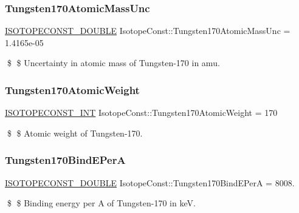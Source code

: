\subsubsection{\texorpdfstring{Tungsten170\+Atomic\+Mass\+Unc}{Tungsten170AtomicMassUnc}}
{\footnotesize\ttfamily \mbox{\hyperlink{group___isotope_const-_macros_ga8f45a7272ce02c0b4c65c44636ed719a}{I\+S\+O\+T\+O\+P\+E\+C\+O\+N\+S\+T\+\_\+\+D\+O\+U\+B\+LE}} Isotope\+Const\+::\+Tungsten170\+Atomic\+Mass\+Unc = 1.\+4165e-\/05}

\$ \$ Uncertainty in atomic mass of Tungsten-\/170 in amu. \mbox{\label{group___isotope_const-_tungsten-_w170_ga3981fdabda3e127cd873873fe976ad72}} 
\subsubsection{\texorpdfstring{Tungsten170\+Atomic\+Weight}{Tungsten170AtomicWeight}}
{\footnotesize\ttfamily \mbox{\hyperlink{group___isotope_const-_macros_ga5f18360b3e99483a35c32d789e62621c}{I\+S\+O\+T\+O\+P\+E\+C\+O\+N\+S\+T\+\_\+\+I\+NT}} Isotope\+Const\+::\+Tungsten170\+Atomic\+Weight = 170}

\$ \$ Atomic weight of Tungsten-\/170. \mbox{\label{group___isotope_const-_tungsten-_w170_ga9556bd0500cb8e52bbf3ca7395837109}} 
\subsubsection{\texorpdfstring{Tungsten170\+Bind\+E\+PerA}{Tungsten170BindEPerA}}
{\footnotesize\ttfamily \mbox{\hyperlink{group___isotope_const-_macros_ga8f45a7272ce02c0b4c65c44636ed719a}{I\+S\+O\+T\+O\+P\+E\+C\+O\+N\+S\+T\+\_\+\+D\+O\+U\+B\+LE}} Isotope\+Const\+::\+Tungsten170\+Bind\+E\+PerA = 8008.}

\$ \$ Binding energy per A of Tungsten-\/170 in keV. \mbox{\label{group___isotope_const-_tungsten-_w170_ga096d37b4c1a100207c1bb60510e5d390}} 
